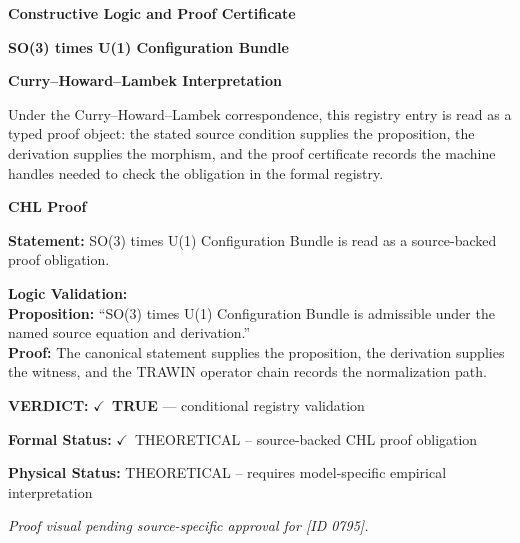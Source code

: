 \clearpage
\begingroup\tzpsupportsetup
\noindent\textbf{\fontsize{10.8pt}{12.8pt}\selectfont [ID 0795] Constructive Logic and Proof Certificate}\par
\noindent\textbf{\fontsize{10pt}{12pt}\selectfont SO(3) times U(1) Configuration Bundle}\par
\vspace{0.45em}
\begingroup
\footnotesize
\setlength{\parskip}{0.22em}
\setlength{\parindent}{0pt}
\noindent\textbf{Curry--Howard--Lambek Interpretation}\par
Under the Curry--Howard--Lambek correspondence, this registry entry is read as a typed proof
object: the stated source condition supplies the proposition, the derivation supplies the
morphism, and the proof certificate records the machine handles needed to check the obligation
in the formal registry.

\vspace{0.45em}
\noindent\textbf{CHL Proof}\par
\textbf{Statement:} SO(3) times U(1) Configuration Bundle is read as a source-backed proof obligation.

\textbf{Logic Validation:}\\
\textbf{Proposition:} ``SO(3) times U(1) Configuration Bundle is admissible under the named source equation and derivation.''\\
\textbf{Proof:} The canonical statement supplies the proposition, the derivation supplies the witness, and the TRAWIN operator chain records the normalization path.

\textbf{VERDICT:} \ensuremath{\checkmark}\ \textbf{TRUE} --- conditional registry validation

\textbf{Formal Status:} \ensuremath{\checkmark}\ THEORETICAL -- source-backed CHL proof obligation

\textbf{Physical Status:} THEORETICAL -- requires model-specific empirical interpretation
\par\vspace{0.45em}
\par
\vfill
\begingroup\footnotesize\itshape
Proof visual pending source-specific approval for [ID 0795].
\par\endgroup
\vfill
\endgroup
\endgroup
